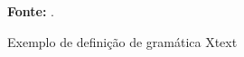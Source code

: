 \begin{figure}[h!]
\centering

\caption{\textmd{Exemplo de definição de gramática Xtext}}
\label{fig:xtextgramatica}

\par\medskip\textbf{Fonte:} . \par\medskip
\end{figure}
